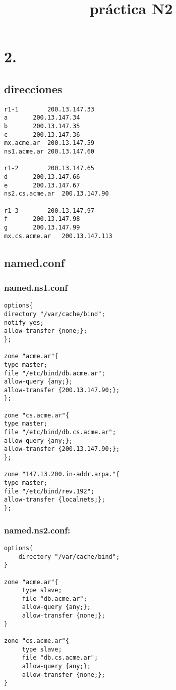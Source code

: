 \documentclass[11pt]{article}
\date{}
\title{práctica N2}
\begin{document}
\maketitle
\section*{2.}
\label{sec:org39eb6b0}
\subsection*{direcciones}
\label{sec:org9d59948}
\begin{verbatim}
r1-1		200.13.147.33
a		200.13.147.34
b		200.13.147.35
c		200.13.147.36
mx.acme.ar	200.13.147.59
ns1.acme.ar	200.13.147.60

r1-2		200.13.147.65
d		200.13.147.66
e		200.13.147.67
ns2.cs.acme.ar	200.13.147.90

r1-3		200.13.147.97
f		200.13.147.98
g		200.13.147.99
mx.cs.acme.ar	200.13.147.113
\end{verbatim}
\subsection*{named.conf}
\label{sec:org3e00842}
\subsubsection*{named.ns1.conf}
\label{sec:orgc46b736}
\begin{verbatim}
options{
directory "/var/cache/bind";
notify yes;
allow-transfer {none;};
};

zone "acme.ar"{
type master;
file "/etc/bind/db.acme.ar";
allow-query {any;};
allow-transfer {200.13.147.90;};
};

zone "cs.acme.ar"{
type master;
file "/etc/bind/db.cs.acme.ar";
allow-query {any;};
allow-transfer {200.13.147.90;};
};

zone "147.13.200.in-addr.arpa."{
type master;
file "/etc/bind/rev.192";
allow-transfer {localnets;};
};
\end{verbatim}
\subsubsection*{named.ns2.conf:}
\label{sec:org850dec4}
\begin{verbatim}
options{
	directory "/var/cache/bind";
}

zone "acme.ar"{
     type slave;
     file "db.acme.ar";
     allow-query {any;};
     allow-transfer {none;};
}

zone "cs.acme.ar"{
     type slave;
     file "db.cs.acme.ar";
     allow-query {any;};
     allow-transfer {none;};
}
\end{verbatim}
\end{document}
